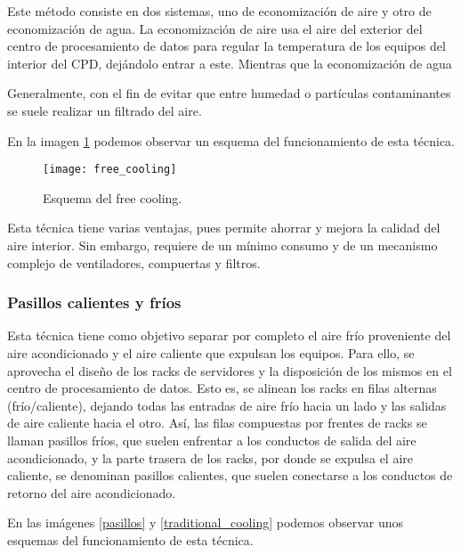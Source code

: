 Este método consiste en dos sistemas, uno de economización de aire y otro de economización de agua. La economización de aire usa el aire del exterior del centro de procesamiento de datos para regular la temperatura de los equipos del interior del CPD, dejándolo entrar a este. Mientras que la economización de agua %


Generalmente, con el fin de evitar que entre humedad o partículas contaminantes se suele realizar un filtrado del aire.

En la imagen \ref{free_coling} podemos observar un esquema del funcionamiento de esta técnica.

\begin{figure}
    \begin{center}
        \label{free_coling}
        \texttt{[image: free\_cooling]}
        \caption{Esquema del free cooling.}
    \end{center}
\end{figure}

Esta técnica tiene varias ventajas, pues permite ahorrar y mejora la calidad del aire interior. Sin embargo, requiere de un mínimo consumo y de un mecanismo complejo de ventiladores, compuertas y filtros.

\subsubsection{Pasillos calientes y fríos}

Esta técnica tiene como objetivo separar por completo el aire frío proveniente del aire acondicionado y el aire caliente que expulsan los equipos. Para ello, se aprovecha el diseño de los racks de servidores y la disposición de los mismos en el centro de procesamiento de datos. Esto es, se alinean los racks en filas alternas (frío/caliente), dejando todas las entradas de aire frío hacia un lado y las salidas de aire caliente hacia el otro. Así, las filas compuestas por frentes de racks se llaman pasillos fríos, que suelen enfrentar a los conductos de salida del aire acondicionado, y la parte trasera de los racks, por donde se expulsa el aire caliente, se denominan pasillos calientes, que suelen conectarse a los conductos de retorno del aire acondicionado.

En las imágenes \ref{pasillos} y \ref{traditional_cooling} podemos observar unos esquemas del funcionamiento de esta técnica.

